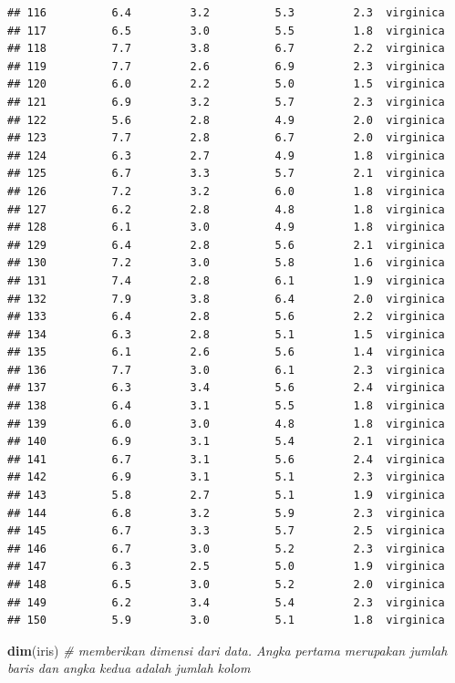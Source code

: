 \documentclass[]{article}
\newenvironment{Shaded}{\begin{snugshade}}{\end{snugshade}}
\newcommand{\CommentTok}[1]{\textcolor[rgb]{0.56,0.35,0.01}{\textit{#1}}}
\newcommand{\KeywordTok}[1]{\textcolor[rgb]{0.13,0.29,0.53}{\textbf{#1}}}
\newcommand{\NormalTok}[1]{#1}
\begin{document}
\begin{verbatim}
## 116          6.4         3.2          5.3         2.3  virginica
## 117          6.5         3.0          5.5         1.8  virginica
## 118          7.7         3.8          6.7         2.2  virginica
## 119          7.7         2.6          6.9         2.3  virginica
## 120          6.0         2.2          5.0         1.5  virginica
## 121          6.9         3.2          5.7         2.3  virginica
## 122          5.6         2.8          4.9         2.0  virginica
## 123          7.7         2.8          6.7         2.0  virginica
## 124          6.3         2.7          4.9         1.8  virginica
## 125          6.7         3.3          5.7         2.1  virginica
## 126          7.2         3.2          6.0         1.8  virginica
## 127          6.2         2.8          4.8         1.8  virginica
## 128          6.1         3.0          4.9         1.8  virginica
## 129          6.4         2.8          5.6         2.1  virginica
## 130          7.2         3.0          5.8         1.6  virginica
## 131          7.4         2.8          6.1         1.9  virginica
## 132          7.9         3.8          6.4         2.0  virginica
## 133          6.4         2.8          5.6         2.2  virginica
## 134          6.3         2.8          5.1         1.5  virginica
## 135          6.1         2.6          5.6         1.4  virginica
## 136          7.7         3.0          6.1         2.3  virginica
## 137          6.3         3.4          5.6         2.4  virginica
## 138          6.4         3.1          5.5         1.8  virginica
## 139          6.0         3.0          4.8         1.8  virginica
## 140          6.9         3.1          5.4         2.1  virginica
## 141          6.7         3.1          5.6         2.4  virginica
## 142          6.9         3.1          5.1         2.3  virginica
## 143          5.8         2.7          5.1         1.9  virginica
## 144          6.8         3.2          5.9         2.3  virginica
## 145          6.7         3.3          5.7         2.5  virginica
## 146          6.7         3.0          5.2         2.3  virginica
## 147          6.3         2.5          5.0         1.9  virginica
## 148          6.5         3.0          5.2         2.0  virginica
## 149          6.2         3.4          5.4         2.3  virginica
## 150          5.9         3.0          5.1         1.8  virginica
\end{verbatim}

\begin{Shaded}
\begin{Highlighting}[]
\KeywordTok{dim}\NormalTok{(iris) }\CommentTok{# memberikan dimensi dari data. Angka pertama merupakan jumlah baris dan angka kedua adalah jumlah kolom}
\end{Highlighting}
\end{Shaded}
\end{document}
